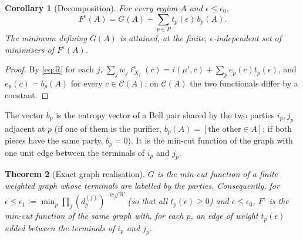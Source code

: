 \documentclass[aps,prd,onecolumn,superscriptaddress,nofootinbib,amsmath,amssymb,11pt]{revtex4-2}
\newtheorem{theorem}{Theorem}[section]
\newtheorem{corollary}[theorem]{Corollary}
\theoremstyle{definition}
\newcommand{\Cut}{\mathcal{C}}
\newcommand{\eps}{\epsilon}
\begin{document}
\begin{corollary}[Decomposition]\label{cor:decomp}
For every region $A$ and $\eps\le\eps_0$,
\begin{equation}\label{eq:D}
F^\eps(A)=G(A)+\sum_{p\in P}t_p(\eps)\,b_p(A).
\end{equation}
The minimum defining $G(A)$ is attained, at the finite, $\eps$-independent set of minimisers of $F^\eps(A)$.
\end{corollary}

\begin{proof}
By \eqref{eq:R} for each $j$, $\sum_jw_j\ell^\eps_{X_j}(c)=i(\mu',c)+\sum_pe_p(c)t_p(\eps)$, and $e_p(c)=b_p(A)$ for
every $c\in\Cut(A)$; on $\Cut(A)$ the two functionals differ by a constant.
\end{proof}

The vector $b_p$ is the entropy vector of a Bell pair shared by the two parties $i_p,j_p$ adjacent at $p$ (if one of
them is the purifier, $b_p(A)=[\text{the other}\in A]$; if both pieces have the same party, $b_p=0$). It is the
min-cut function of the graph with one unit edge between the terminals of $i_p$ and $j_p$.

\begin{theorem}[Exact graph realisation]\label{thm:graph}
$G$ is the min-cut function of a finite weighted graph whose terminals are labelled by the parties. Consequently,
for $\eps\le\eps_1:=\min_p\prod_j(d_p^{(j)})^{-w_j/W}$ (so that all $t_p(\eps)\ge0$) and $\eps\le\eps_0$, $F^\eps$ is the
min-cut function of the same graph with, for each $p$, an edge of weight $t_p(\eps)$ added between the terminals of
$i_p$ and $j_p$.
\end{theorem}
\end{document}
